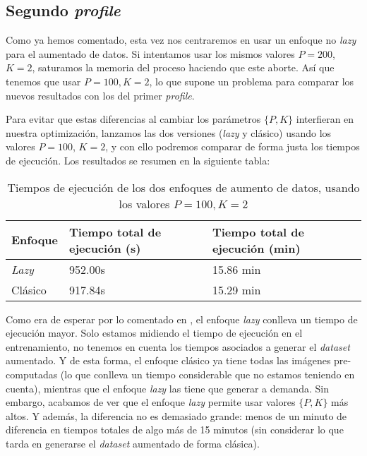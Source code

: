 \subsection{Segundo \textit{profile}}

Como ya hemos comentado, esta vez nos centraremos en usar un enfoque no \textit{lazy} para el aumentado de datos. Si intentamos usar los mismos valores $P = 200$, $K = 2$, saturamos la memoria del proceso haciendo que este aborte. Así que tenemos que usar $P = 100, K = 2$, lo que supone un problema para comparar los nuevos resultados con los del primer \textit{profile}.

Para evitar que estas diferencias al cambiar los parámetros $\{P, K\}$ interfieran en nuestra optimización, lanzamos las dos versiones (\textit{lazy} y clásico) usando los valores $P = 100$, $K = 2$, y con ello podremos comparar de forma justa los tiempos de ejecución. Los resultados se resumen en la siguiente tabla:

\begin{table}[H]
\centering
\begin{tabular}{|l|l|l|}
    \hline
    \textbf{Enfoque} & \textbf{Tiempo total de ejecución (s)} & \textbf{Tiempo total de ejecución (min)} \\
    \hline

    \textit{Lazy} & 952.00s & 15.86 min \\
    Clásico       & 917.84s & 15.29 min \\

    \hline

\end{tabular}
\caption{Tiempos de ejecución de los dos enfoques de aumento de datos, usando los valores $P = 100, K = 2$}
\end{table}

Como era de esperar por lo comentado en , el enfoque \textit{lazy} conlleva un tiempo de ejecución mayor. Solo estamos midiendo el tiempo de ejecución en el entrenamiento, no tenemos en cuenta los tiempos asociados a generar el \textit{dataset} aumentado. Y de esta forma, el enfoque clásico ya tiene todas las imágenes pre-computadas (lo que conlleva un tiempo considerable que no estamos teniendo en cuenta), mientras que el enfoque \textit{lazy} las tiene que generar a demanda. Sin embargo, acabamos de ver que el enfoque \textit{lazy} permite usar valores $\{P, K\}$ más altos. Y además, la diferencia no es demasiado grande: menos de un minuto de diferencia en tiempos totales de algo más de 15 minutos (sin considerar lo que tarda en generarse el \textit{dataset} aumentado de forma clásica).

